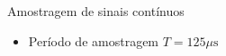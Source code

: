 \begin{slide}[toc=]{Amostragem de sinais contínuos}
\begin{itemize}
 \item Período de amostragem $T=125 \mu \text{s}$\\
    \begin{center}
    \end{center}
\end{itemize}
\end{slide}


